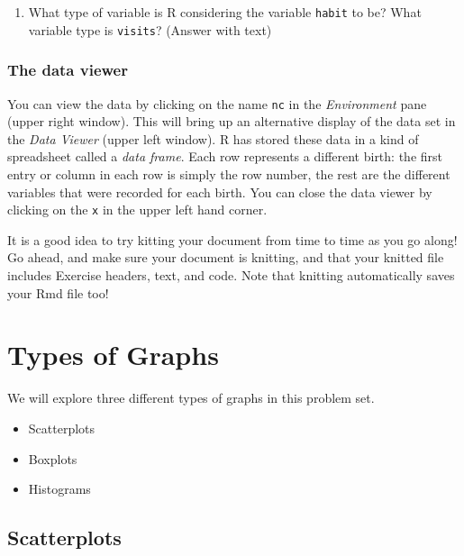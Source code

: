 \documentclass[]{article}
\providecommand{\tightlist}{%
  \setlength{\itemsep}{0pt}\setlength{\parskip}{0pt}}
\begin{document}
\begin{enumerate}
\def\labelenumi{\arabic{enumi}.}
\tightlist
\item
  What type of variable is R considering the variable \texttt{habit} to
  be? What variable type is \texttt{visits}? (Answer with text)
\end{enumerate}

\hypertarget{the-data-viewer}{%
\subsubsection{The data viewer}\label{the-data-viewer}}

You can view the data by clicking on the name \texttt{nc} in the
\emph{Environment} pane (upper right window). This will bring up an
alternative display of the data set in the \emph{Data Viewer} (upper
left window). R has stored these data in a kind of spreadsheet called a
\emph{data frame}. Each row represents a different birth: the first
entry or column in each row is simply the row number, the rest are the
different variables that were recorded for each birth. You can close the
data viewer by clicking on the \texttt{x} in the upper left hand corner.

\leavevmode\hypertarget{license}{}%
It is a good idea to try kitting your document from time to time as you
go along! Go ahead, and make sure your document is knitting, and that
your knitted file includes Exercise headers, text, and code. Note that
knitting automatically saves your Rmd file too!

\hypertarget{types-of-graphs}{%
\section{Types of Graphs}\label{types-of-graphs}}

We will explore three different types of graphs in this problem set.

\begin{itemize}
\tightlist
\item
  Scatterplots
\item
  Boxplots
\item
  Histograms
\end{itemize}

\hypertarget{scatterplots}{%
\subsection{Scatterplots}\label{scatterplots}}
\end{document}
